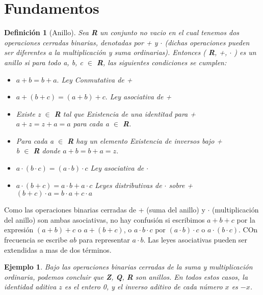 \documentclass{llncs}
\theoremstyle{plane}
\newtheorem{defi}{Definición}
\newtheorem{ej}{Ejemplo}
\begin{document}
\section{Fundamentos}
\begin{defi}[Anillo]
Sea \textbf{R} un conjunto no vacio en el cual tenemos dos operaciones cerradas binarias, denotadas por + y $\cdot$ (dichas operaciones pueden ser diferentes a la multiplicación y suma ordinarias). Entonces ( \textbf{R}, +, $\cdot$ ) es un \textit{anillo} si para todo \textit{a}, \textit{b}, \textit{c} $\in$ \textbf{R}, las siguientes condiciones se cumplen: 



\begin{itemize}
\item [\textbf{a)}]$a+b=b+a.$ \hfill Ley Conmutativa de +
\item [\textbf{b)}]$a+(b+c)=(a+b)+c.$ \hfill Ley asociativa de +
\item [\textbf{c)}] Existe \textit{z} $\in$ \textbf{R} tal que \hfill Existencia de una identitad para + \\ $a+z=z+a=a$ para cada \textit{a} $\in$ \textbf{R}.  
\item [\textbf{d)}] Para cada \textit{a} $\in$ \textbf{R} hay un elemento   \hfill Existencia de inversos bajo +\\ \textit{b} 
$\in$ \textbf{R} donde $a+b=b+a=z.$ 

\item [\textbf{e)}]$a \cdot (b \cdot c)=(a \cdot b) \cdot c$ \hfill Ley asociativa de $\cdot$ 

\item [\textbf{f)}]$a \cdot (b + c)=a \cdot b + a \cdot c$ \hfill Leyes distributivas de $\cdot$ sobre +  \\
$ (b + c) \cdot a =  b \cdot a + c \cdot a$  
\end{itemize}
\end{defi}

Como las operaciones binarias cerradas de + (suma del anillo) y $\cdot$ (multiplicación del anillo) son ambas asociativas, no hay confusión si escribimos $a+b+c$ por la expresión $(a+b)+c$ o $a+(b+c)$, o $a \cdot b \cdot c$ por $(a \cdot b) \cdot c$ o $a \cdot( b \cdot c)$. COn frecuencia se escribe $ab$ para representar $a \cdot b$. Las leyes asociativas pueden ser extendidas a mas de dos términos.



\begin{ej}
Bajo las operaciones binarias cerradas de la suma y multiplicación ordinaria, podemos concluir que \textbf{Z}, \textbf{Q}, \textbf{R} son anillos. En todos estos casos, la identidad aditiva $z$ es el entero 0, y el inverso aditivo de cada número $x$ es $-x$.
\end{ej}
\end{document}
